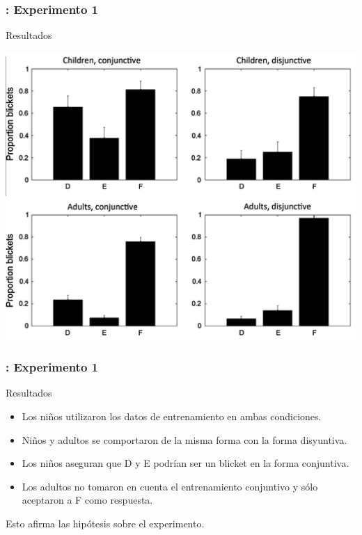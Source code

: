 \begin{frame}[fragile]
  \frametitle{\shortt: Experimento 1}
    \begin{block}{Resultados}
    \begin{center}
    \includegraphics[scale=0.25]{images/experiment1results.png}
    \end{center}
    \end{block}
\end{frame}

\begin{frame}[fragile]
  \frametitle{\shortt: Experimento 1}

    \begin{block}{Resultados}

        \begin{itemize}
        \item Los niños utilizaron los datos de entrenamiento en ambas condiciones.
        \item Niños y adultos se comportaron de la misma forma con la forma disyuntiva.
        \item Los niños aseguran que D y E podrían ser un blicket en la forma conjuntiva.
        \item Los adultos no tomaron en cuenta el entrenamiento conjuntivo y sólo aceptaron a F como respuesta.
        \end{itemize}
        
        Esto afirma las hipótesis sobre el experimento.
    \end{block}

\end{frame}

